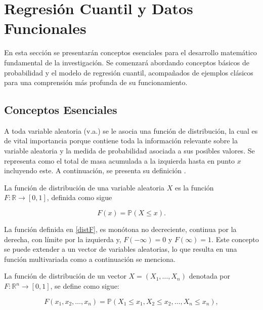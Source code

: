 \chapter{Regresión Cuantil y Datos Funcionales}\label{RegCuanDatosFun}

En esta sección se presentarán conceptos esenciales para el desarrollo matemático fundamental de la investigación. Se comenzará abordando conceptos básicos de probabilidad y el modelo de regresión cuantil, acompañados de ejemplos clásicos para una comprensión más profunda de su funcionamiento.



\section{Conceptos Esenciales}

A toda variable aleatoria (v.a.) se le asocia una función de distribución, la cual es de vital importancia porque contiene toda la información relevante sobre la variable aleatoria y la medida de probabilidad asociada a sus posibles valores. Se representa como el total de masa acumulada a la izquierda hasta en punto $x$ incluyendo este. A continuación, se presenta su definición \cite{Rincon}.

\begin{defn}
    La función de distribución de una variable aleatoria $X$ es la función $F: \mathbb{R} \to [0, 1]$, definida como sigue

    \begin{equation}\label{distF}
        F(x) = \mathbb{P}(X \leq x).
    \end{equation}
\end{defn}

La función definida en \eqref{distF}, es monótona no decreciente, continua por la derecha, con límite por la izquierda y, $F(-\infty) = 0$ y $F(\infty) = 1$. Este concepto se puede extender a un vector de variables aleatorias, lo que resulta en una función multivariada como a continuación se menciona. 

\begin{defn}
    La función de distribución de un vector $X = (X_1, \dots , X_n)$ denotada por $F: \mathbb{R}^{n} \to [0, 1]$, se define como sigue:

    \begin{equation}
        F(x_1, x_2, \dots, x_n) = \mathbb{P}\left ( X_1 \leq x_1, X_2 \leq x_2, \dots, X_n \leq x_n \right ),
    \end{equation}
\end{defn}

